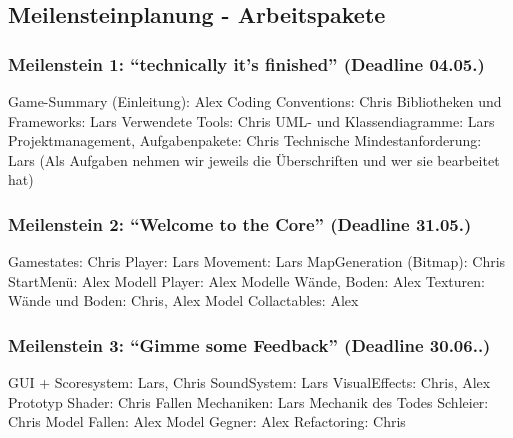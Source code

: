 \documentclass{article}
\begin{document}
\newpage

\subsection{Meilensteinplanung - Arbeitspakete}


\subsubsection{Meilenstein 1: “technically it’s finished” (Deadline 04.05.)}
Game-Summary (Einleitung): Alex\newline
Coding Conventions: Chris\newline
Bibliotheken und Frameworks: Lars\newline
Verwendete Tools: Chris\newline
UML- und Klassendiagramme: Lars\newline
Projektmanagement, Aufgabenpakete: Chris\newline
Technische Mindestanforderung: Lars\newline
(Als Aufgaben nehmen wir jeweils die Überschriften und wer sie bearbeitet hat)\newline
\newline
\subsubsection{Meilenstein 2: “Welcome to the Core” (Deadline 31.05.)}
Gamestates: Chris\newline
Player: Lars\newline
Movement: Lars
MapGeneration (Bitmap): Chris\newline
StartMenü: Alex\newline
Modell Player: Alex\newline
Modelle Wände, Boden: Alex\newline
Texturen: Wände und Boden: Chris, Alex\newline
Model Collactables: Alex\newline
\newline
\subsubsection{Meilenstein 3: “Gimme some Feedback” (Deadline 30.06..)}
GUI + Scoresystem: Lars, Chris\newline
SoundSystem: Lars\newline
VisualEffects: Chris, Alex\newline
Prototyp Shader: Chris\newline
Fallen Mechaniken: Lars\newline
Mechanik des Todes Schleier: Chris\newline
Model Fallen: Alex\newline
Model Gegner: Alex\newline
Refactoring: Chris\newline
\end{document}
